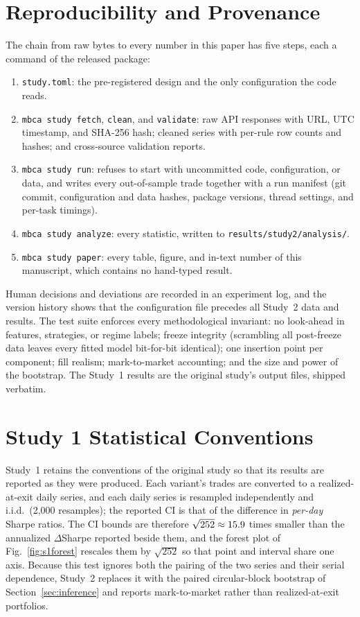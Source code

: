 \appendices

\section{Reproducibility and Provenance}
\label{app:repro}

The chain from raw bytes to every number in this paper has five steps, each a command of the released package:
\begin{enumerate}
  \item \texttt{study.toml}: the pre-registered design and the only configuration the code reads.
  \item \texttt{mbca study fetch}, \texttt{clean}, and \texttt{validate}: raw API responses with URL, UTC timestamp,
        and SHA-256 hash; cleaned series with per-rule row counts and hashes; and cross-source validation reports.
  \item \texttt{mbca study run}: refuses to start with uncommitted code, configuration, or data, and writes every
        out-of-sample trade together with a run manifest (git commit, configuration and data hashes, package
        versions, thread settings, and per-task timings).
  \item \texttt{mbca study analyze}: every statistic, written to \texttt{results/study2/analysis/}.
  \item \texttt{mbca study paper}: every table, figure, and in-text number of this manuscript, which contains no
        hand-typed result.
\end{enumerate}
Human decisions and deviations are recorded in an experiment log, and the version history shows that the
configuration file precedes all Study~2 data and results. The test suite enforces every methodological invariant: no
look-ahead in features, strategies, or regime labels; freeze integrity (scrambling all post-freeze data leaves every
fitted model bit-for-bit identical); one insertion point per component; fill realism; mark-to-market accounting; and
the size and power of the bootstrap. The Study~1 results are the original study's output files, shipped verbatim.

\section{Study 1 Statistical Conventions}
\label{app:s1stats}

Study~1 retains the conventions of the original study so that its results are reported as they were produced. Each
variant's trades are converted to a realized-at-exit daily series, and each daily series is resampled independently
and i.i.d.\ (2{,}000 resamples); the reported CI is that of the difference in \emph{per-day} Sharpe ratios. The CI
bounds are therefore $\sqrt{252} \approx 15.9$ times smaller than the annualized $\Delta$Sharpe reported beside
them, and the forest plot of Fig.~\ref{fig:s1forest} rescales them by $\sqrt{252}$ so that point and interval share
one axis. Because this test ignores both the pairing of the two series and their serial dependence, Study~2 replaces
it with the paired circular-block bootstrap of Section~\ref{sec:inference} and reports mark-to-market rather than
realized-at-exit portfolios.
